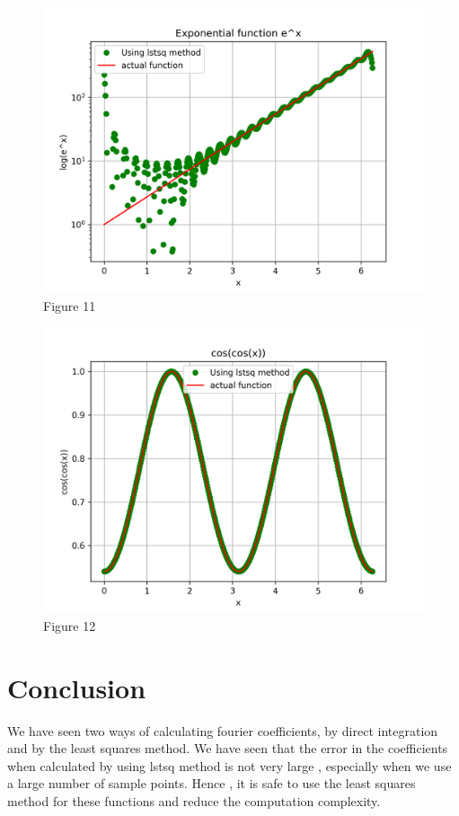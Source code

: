 \documentclass[11pt, a4paper]{article}
\begin{document}
\begin{figure}[!tbh]
\centering
\includegraphics[scale=0.6]{assn4_plot11.png}
\caption{Figure 11}
\label{fig:plot11}
\end{figure} 

\begin{figure}[!tbh]
\centering
\includegraphics[scale=0.6]{assn4_plot12.png}
\caption{Figure 12}
\label{fig:plot12}
\end{figure} 

\section*{Conclusion}
We have seen two ways of calculating fourier coefficients, by direct integration and by the least squares method. We have seen that the error in the coefficients when calculated by using lstsq method is not very large , especially when we use a large number of sample points. Hence , it is safe to use the least squares method for these functions and reduce the computation complexity.
\end{document}
